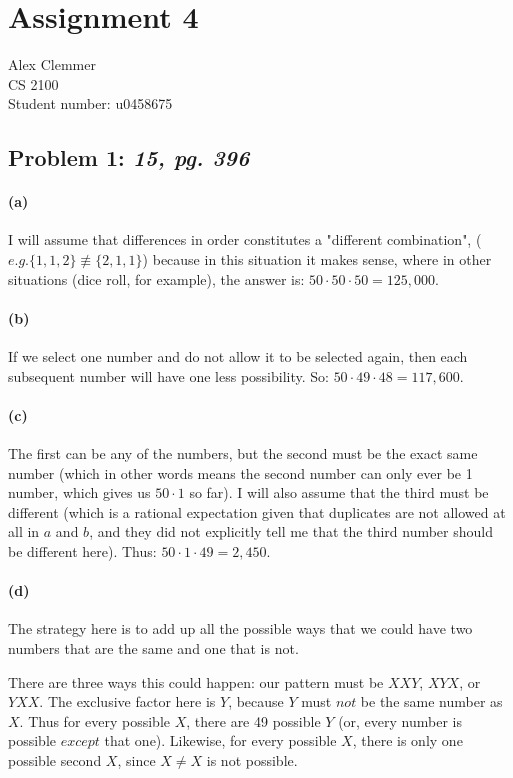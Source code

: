 \documentclass[a4paper]{article}
\begin{document}
\section*{Assignment 4}
Alex Clemmer\\
CS 2100 \\
Student number: u0458675

\subsection*{Problem 1: \textit{15, pg. 396}} 

\paragraph{(a)} I will assume that differences in order constitutes a "different combination", ($\textit{e.g.} \{1,1,2\} \not\equiv \{2,1,1\}$) because in this situation it makes sense, where in other situations (dice roll, for example), the answer is: $50 \cdot 50 \cdot 50 = 125,000$.

\paragraph{(b)} If we select one number and do not allow it to be selected again, then each subsequent number will have one less possibility. So: $50 \cdot 49 \cdot 48 = 117,600$.

\paragraph{(c)} The first can be any of the numbers, but the second must be the exact same number (which in other words means the second number can only ever be 1 number, which gives us $50 \cdot 1$ so far). I will also assume that the third must be different (which is a rational expectation given that duplicates are not allowed at all in $\textit{a}$ and $\textit{b}$, and they did not explicitly tell me that the third number should be different here). Thus: $50 \cdot 1 \cdot 49 = 2,450$.

\paragraph{(d)} The strategy here is to add up all the possible ways that we could have two numbers that are the same and one that is not.

There are three ways this could happen: our pattern must be $XXY$, $XYX$, or $YXX$. The exclusive factor here is $Y$, because $Y$ must $\textit{not}$ be the same number as $X$. Thus for every possible $X$, there are 49 possible $Y$ (or, every number is possible $\textit{except}$ that one). Likewise, for every possible $X$, there is only one possible second $X$, since $X \ne X$ is not possible.
\end{document}
